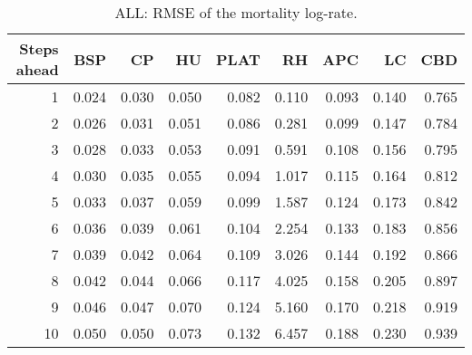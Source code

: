 % 
\begin{table}[ht]
\centering
\begin{tabular}{rrrrrrrrr}
  \hline
Steps ahead & BSP & CP & HU & PLAT & RH & APC & LC & CBD \\ 
  \hline
   1 & 0.024 & 0.030 & 0.050 & 0.082 & 0.110 & 0.093 & 0.140 & 0.765 \\ 
     2 & 0.026 & 0.031 & 0.051 & 0.086 & 0.281 & 0.099 & 0.147 & 0.784 \\ 
     3 & 0.028 & 0.033 & 0.053 & 0.091 & 0.591 & 0.108 & 0.156 & 0.795 \\ 
     4 & 0.030 & 0.035 & 0.055 & 0.094 & 1.017 & 0.115 & 0.164 & 0.812 \\ 
     5 & 0.033 & 0.037 & 0.059 & 0.099 & 1.587 & 0.124 & 0.173 & 0.842 \\ 
     6 & 0.036 & 0.039 & 0.061 & 0.104 & 2.254 & 0.133 & 0.183 & 0.856 \\ 
     7 & 0.039 & 0.042 & 0.064 & 0.109 & 3.026 & 0.144 & 0.192 & 0.866 \\ 
     8 & 0.042 & 0.044 & 0.066 & 0.117 & 4.025 & 0.158 & 0.205 & 0.897 \\ 
     9 & 0.046 & 0.047 & 0.070 & 0.124 & 5.160 & 0.170 & 0.218 & 0.919 \\ 
    10 & 0.050 & 0.050 & 0.073 & 0.132 & 6.457 & 0.188 & 0.230 & 0.939 \\ 
   \hline
\end{tabular}
\caption{ALL: RMSE of the mortality log-rate.} 
\end{table}
